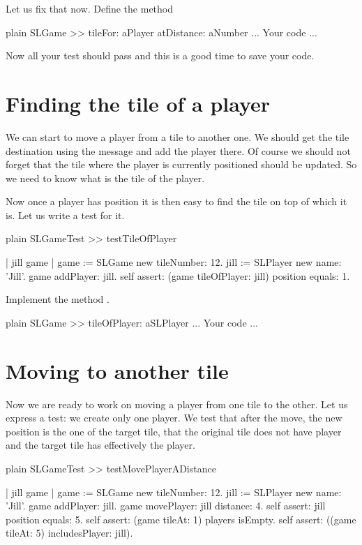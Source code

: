 \documentclass[10pt,twoside,english]{_support/latex/sbabook/sbabook}
\begin{document}
Let us fix that now. Define the method 

\begin{displaycode}{plain}
SLGame >> tileFor: aPlayer atDistance: aNumber
	... Your code ...
\end{displaycode}

Now all your test should pass and this is a good time to save your code.
\section{Finding the tile of a player}
We can start to move a player from a tile to another one. 
We should get the tile destination using the message  and add the player there. Of course we should not forget that the tile where the player is currently positioned should be updated. So we need to know what is the tile of the player.

Now once a player has position it is then easy to find the tile on top of which it is.
Let us write a test for it. 

\begin{displaycode}{plain}
SLGameTest >> testTileOfPlayer
	
	| jill game |
	game := SLGame new tileNumber: 12.
	jill := SLPlayer new name: 'Jill'.
	game addPlayer: jill. 
	self assert: (game tileOfPlayer: jill) position equals: 1.
\end{displaycode}

Implement the method .

\begin{displaycode}{plain}
SLGame >> tileOfPlayer: aSLPlayer 
	... Your code ...
\end{displaycode}
\section{Moving to another tile}
Now we are ready to work on moving a player from one tile to the other. 
Let us express a test: we create only one player. We test that after the move,  the new position is the one of the target tile, that the original tile does not have player and the target tile has effectively the player.

\begin{displaycode}{plain}
SLGameTest >> testMovePlayerADistance
	
	| jill game |
	game := SLGame new tileNumber: 12.
	jill := SLPlayer new name: 'Jill'.
	game addPlayer: jill. 
	game movePlayer: jill distance: 4.
	self assert: jill position equals: 5.
	self assert: (game tileAt: 1) players isEmpty.
	self assert: ((game tileAt: 5) includesPlayer: jill).
\end{displaycode}
\end{document}
